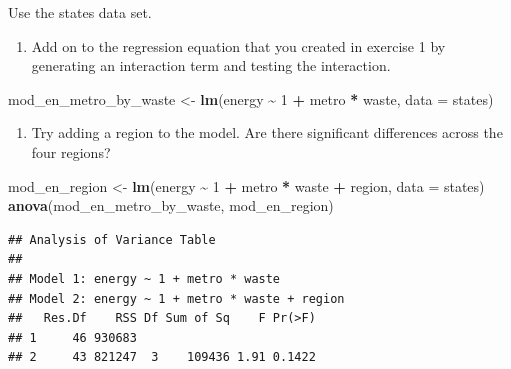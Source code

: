\documentclass[
]{book}
\newenvironment{Shaded}{\begin{snugshade}}{\end{snugshade}}
\newcommand{\DataTypeTok}[1]{\textcolor[rgb]{0.13,0.29,0.53}{#1}}
\newcommand{\DecValTok}[1]{\textcolor[rgb]{0.00,0.00,0.81}{#1}}
\newcommand{\KeywordTok}[1]{\textcolor[rgb]{0.13,0.29,0.53}{\textbf{#1}}}
\newcommand{\NormalTok}[1]{#1}
\newcommand{\OperatorTok}[1]{\textcolor[rgb]{0.81,0.36,0.00}{\textbf{#1}}}
\newcommand{\StringTok}[1]{\textcolor[rgb]{0.31,0.60,0.02}{#1}}
\providecommand{\tightlist}{%
  \setlength{\itemsep}{0pt}\setlength{\parskip}{0pt}}
\begin{document}
\begin{alert}

Use the states data set.

\begin{enumerate}
\def\labelenumi{\arabic{enumi}.}
\tightlist
\item
  Add on to the regression equation that you created in exercise 1 by generating an interaction term and testing the interaction.
\end{enumerate}

\begin{Shaded}
\begin{Highlighting}[]
\NormalTok{  mod\_en\_metro\_by\_waste \textless{}{-}}\StringTok{ }\KeywordTok{lm}\NormalTok{(energy }\OperatorTok{\textasciitilde{}}\StringTok{ }\DecValTok{1} \OperatorTok{+}\StringTok{ }\NormalTok{metro }\OperatorTok{*}\StringTok{ }\NormalTok{waste, }\DataTypeTok{data =}\NormalTok{ states)}
\end{Highlighting}
\end{Shaded}

\begin{enumerate}
\def\labelenumi{\arabic{enumi}.}
\setcounter{enumi}{1}
\tightlist
\item
  Try adding a region to the model. Are there significant differences across the four regions?
\end{enumerate}

\begin{Shaded}
\begin{Highlighting}[]
\NormalTok{  mod\_en\_region \textless{}{-}}\StringTok{ }\KeywordTok{lm}\NormalTok{(energy }\OperatorTok{\textasciitilde{}}\StringTok{ }\DecValTok{1} \OperatorTok{+}\StringTok{ }\NormalTok{metro }\OperatorTok{*}\StringTok{ }\NormalTok{waste }\OperatorTok{+}\StringTok{ }\NormalTok{region, }\DataTypeTok{data =}\NormalTok{ states)}
  \KeywordTok{anova}\NormalTok{(mod\_en\_metro\_by\_waste, mod\_en\_region)}
\end{Highlighting}
\end{Shaded}

\begin{verbatim}
## Analysis of Variance Table
## 
## Model 1: energy ~ 1 + metro * waste
## Model 2: energy ~ 1 + metro * waste + region
##   Res.Df    RSS Df Sum of Sq    F Pr(>F)
## 1     46 930683                         
## 2     43 821247  3    109436 1.91 0.1422
\end{verbatim}

\end{alert}
\end{document}
